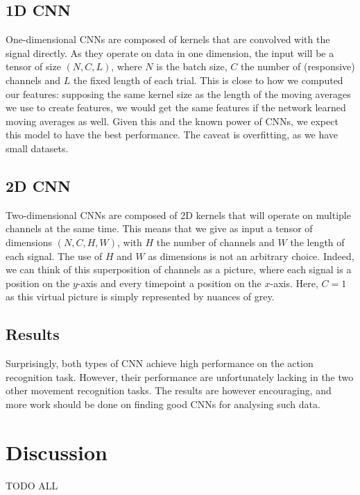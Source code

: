 \documentclass[10pt,conference,compsocconf]{IEEEtran}
\begin{document}
\subsection{1D CNN}
One-dimensional CNNs are composed of kernels that are convolved with the signal directly. As they operate on data in one dimension, the input will be a tensor of size \((N, C, L)\), where \(N\) is the batch size, \(C\) the number of (responsive) channels and \(L\) the fixed length of each trial. This is close to how we computed our features: supposing the same kernel size as the length of the moving averages we use to create features, we would get the same features if the network learned moving averages as well. Given this and the known power of CNNs, we expect this model to have the best performance. The caveat is overfitting, as we have small datasets.

\subsection{2D CNN}
Two-dimensional CNNs are composed of 2D kernels that will operate on multiple channels at the same time. This means that we give as input a tensor of dimensions \((N, C, H, W)\), with \(H\) the number of channels and \(W\) the length of each signal. The use of \(H\) and \(W\) as dimensions is not an arbitrary choice. Indeed, we can think of this superposition of channels as a picture, where each signal is a position on the \(y\)-axis and every timepoint a position on the \(x\)-axis. Here, \(C=1\) as this virtual picture is simply represented by nuances of grey.

\subsection{Results}
Surprisingly, both types of CNN achieve high performance on the action recognition task. However, their performance are unfortunately lacking in the two other movement recognition tasks. The results are however encouraging, and more work should be done on finding good CNNs for analysing such data.

\section{Discussion}
\label{sec:discussion}
TODO ALL
\end{document}
